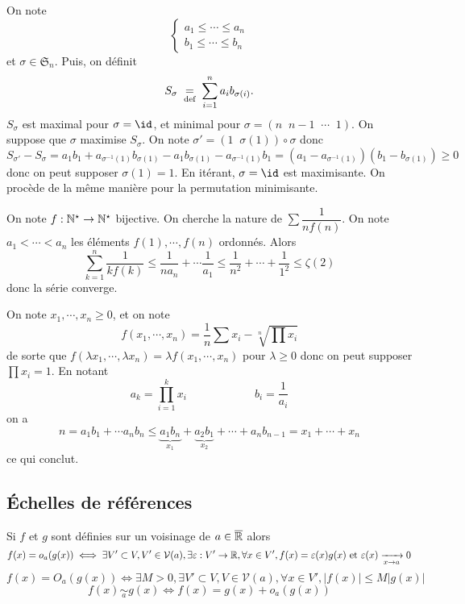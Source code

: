 On note \[
    \begin{cases}
        a_1\leq \cdots \leq a_n\\ b_1\leq \cdots \leq b_n
    \end{cases}
\]
et $\sigma\in\mathfrak S_n$. Puis, on définit \[
    S_\sigma\;\underset{\text{def}}=\;\sum_{i=1}^na_ib_{\sigma(i)}.
\]
$S_\sigma$ est maximal pour $\sigma=\id$, et minimal pour $\sigma=(n\;\;n-1\;\;\cdots \;\; 1)$. On suppose que $\sigma$ maximise $S_\sigma$. On note $\sigma'=(1\;\;\sigma(1))\circ \sigma$ donc \[ S_{\sigma'}-S_\sigma=a_1b_1+a_{\sigma^{-1}(1)}b_{\sigma(1)}-a_1b_{\sigma(1)}-a_{\sigma^{-1}(1)}b_1 =(a_1-a_{\sigma^{-1}(1)})(b_1-b_{\sigma(1)})\geq 0\]
donc on peut supposer $\sigma(1)=1$. En itérant, $\sigma=\id$ est maximisante. On procède de la même manière pour la permutation minimisante.

\begin{ex}[Application 1]
    On note $f:\mathbb N^\star\to\mathbb N^\star$ bijective. On cherche la nature de $\sum\dfrac1{nf(n)}$.
    On note $a_1<\cdots <a_n$ les éléments $f(1), \cdots, f(n)$ ordonnés. Alors \[
        \sum_{k=1}^n\frac1{kf(k)}\leq \frac1{na_n}+\cdots \frac1{a_1}\leq \frac1{n^2}+\cdots +\frac1{1^2}\leq\zeta(2)
    \]
    donc la série converge.
\end{ex}

\begin{ex}[Inégalité AM-GM]
    On note $x_1, \cdots, x_n\geq 0$, et on note \[
        f(x_1, \cdots, x_n)=\frac1n\sum x_i-\sqrt[n]{\prod x_i}
    \]
    de sorte que $f(\lambda x_1, \cdots, \lambda x_n)=\lambda f(x_1, \cdots, x_n)$ pour $\lambda\geq 0$ donc on peut supposer $\prod x_i=1$. En notant \[
        a_k=\prod_{i=1}^kx_i\qquad\qquad\qquad b_i=\frac1{a_i}
    \]
    on a \[
        n=a_1b_1+\cdots a_nb_n\leq \underbrace{a_1b_n}_{x_1}+\underbrace{a_2b_1}_{x_2}+\cdots + a_nb_{n-1}=x_1+\cdots+x_n
    \]
    ce qui conclut.
\end{ex}

\subsection{Échelles de références}

\begin{dfn}[Rappels]
    Si $f$ et $g$ sont définies sur un voisinage de $a\in\overline{\mathbb R}$ alors \[
        f(x)=o_a(g(x))\iff \exists V'\subset V, V'\in\mathcal V(a), \exists \varepsilon:V'\to\mathbb R, \forall x\in V', f(x)=\varepsilon(x)g(x)\text{ et }\varepsilon(x)\xrightarrow[x\to a]{}0
    \]
    \[
        f(x)=O_a(g(x))\iff \exists M>0, \exists V'\subset V, V\in\mathcal V(a), \forall x\in V', |f(x)|\leq M|g(x)|
    \]
    \[
        f(x)\underset a\sim g(x)\iff f(x)=g(x)+o_a(g(x))
    \]
\end{dfn}

